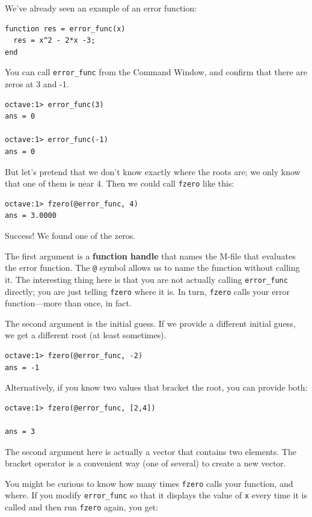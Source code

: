 \documentclass{book}
\begin{document}
We've already seen an example of an error function:

\begin{verbatim}
function res = error_func(x)
  res = x^2 - 2*x -3;
end
\end{verbatim}

You can call {\tt error\_func} from the Command Window, and
confirm that there are zeros at 3 and -1.

\begin{verbatim}
octave:1> error_func(3)
ans = 0

octave:1> error_func(-1)
ans = 0
\end{verbatim}

But let's pretend that we don't know exactly where
the roots are; we only know that one of them is near 4. Then
we could call {\tt fzero} like this:

\begin{verbatim}
octave:1> fzero(@error_func, 4)
ans = 3.0000
\end{verbatim}

Success! We found one of the zeros.

The first argument is a
{\bf function handle} that names the M-file that evaluates
the error function. The {\tt @} symbol allows us to name the
function without calling it. The interesting thing here is
that you are not actually calling {\tt error\_func} directly;
you are just telling {\tt fzero} where it is. In turn, {\tt fzero}
calls your error function---more than once, in fact.

The second argument is the initial guess. If we provide a different
initial guess, we get a different root (at least sometimes).

\begin{verbatim}
octave:1> fzero(@error_func, -2)
ans = -1
\end{verbatim}

Alternatively, if you know two values that bracket the root,
you can provide both:

\begin{verbatim}
octave:1> fzero(@error_func, [2,4])

ans = 3
\end{verbatim}

The second argument here is actually a vector that contains two
elements. The bracket operator is a convenient way (one of several)
to create a new vector.

You might be curious to know how many times {\tt fzero} calls your
function, and where. If you modify {\tt error\_func} so that it displays
the value of {\tt x} every time it is called and then run {\tt fzero}
again, you get:
\end{document}
